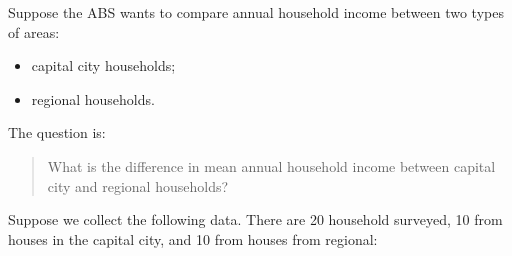 \documentclass[
  letterpaper,
  DIV=11,
  numbers=noendperiod]{scrreprt}
\providecommand{\tightlist}{%
  \setlength{\itemsep}{0pt}\setlength{\parskip}{0pt}}
\begin{document}
\begin{tcolorbox}[enhanced jigsaw, arc=.35mm, bottomrule=.15mm, bottomtitle=1mm, breakable, colback=white, colbacktitle=quarto-callout-note-color!10!white, colframe=quarto-callout-note-color-frame, coltitle=black, left=2mm, leftrule=.75mm, opacityback=0, opacitybacktitle=0.6, rightrule=.15mm, title=\textcolor{quarto-callout-note-color}{\faInfo}\hspace{0.5em}{Running example: household income in two regions}, titlerule=0mm, toprule=.15mm, toptitle=1mm]

Suppose the ABS wants to compare annual household income between two
types of areas:

\begin{itemize}
\tightlist
\item
  capital city households;
\item
  regional households.
\end{itemize}

The question is:

\begin{quote}
What is the difference in mean annual household income between capital
city and regional households?
\end{quote}

\end{tcolorbox}

Suppose we collect the following data. There are 20 household surveyed,
10 from houses in the capital city, and 10 from houses from regional:
\end{document}
